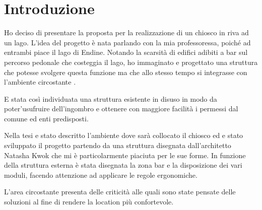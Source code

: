 \section{Introduzione}
Ho deciso di presentare la proposta per la realizzazione di un chiosco in riva ad un lago.
L'idea del progetto è nata parlando con la mia professoressa, poiché ad entrambi piace il lago di Endine.
Notando  la scarsità di edifici adibiti a bar sul percorso pedonale che costeggia il lago, ho immaginato e progettato una struttura che potesse svolgere questa funzione ma che allo stesso tempo si integrasse con l’ambiente circostante .

E stata così individuata una struttura esistente in disuso in modo da poter'usufruire dell'ingombro e ottenere con maggiore facilità i permessi dal comune ed enti predisposti. 


Nella tesi e stato descritto l’ambiente dove sarà collocato il chiosco ed e stato sviluppato il progetto partendo da una struttura disegnata dall'architetto Natasha Kwok che mi è particolarmente piaciuta per le sue forme.
In funzione della struttura esterna  è stata disegnata la zona bar e la disposizione dei vari moduli, facendo attenzione ad applicare le regole ergonomiche.

L'area circostante presenta delle criticità alle quali sono state pensate delle soluzioni al fine di rendere la location più confortevole.
